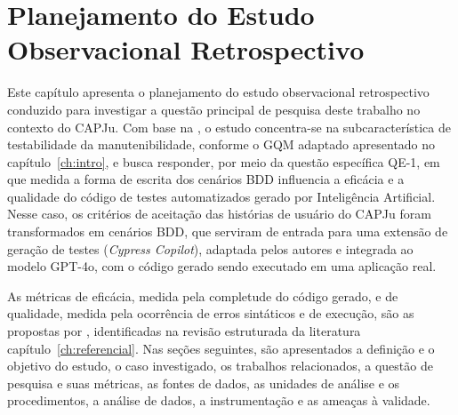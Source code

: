 \chapter{Planejamento do Estudo Observacional Retrospectivo}
\label{ch:proposta}

Este capítulo apresenta o planejamento do estudo observacional retrospectivo conduzido para investigar a questão principal de pesquisa deste trabalho no contexto do CAPJu. Com base na , o estudo concentra-se na subcaracterística de testabilidade da manutenibilidade, conforme o GQM adaptado apresentado no capítulo~\ref{ch:intro}, e busca responder, por meio da questão específica QE-1, em que medida a forma de escrita dos cenários BDD influencia a eficácia e a qualidade do código de testes automatizados gerado por Inteligência Artificial. Nesse caso, os critérios de aceitação das histórias de usuário do CAPJu foram transformados em cenários BDD, que serviram de entrada para uma extensão de geração de testes (\textit{Cypress Copilot}), adaptada pelos autores e integrada ao modelo GPT-4o, com o código gerado sendo executado em uma aplicação real.

As métricas de eficácia, medida pela completude do código gerado, e de qualidade, medida pela ocorrência de erros sintáticos e de execução, são as propostas por , identificadas na revisão estruturada da literatura capítulo~\ref{ch:referencial}. Nas seções seguintes, são apresentados a definição e o objetivo do estudo, o caso investigado, os trabalhos relacionados, a questão de pesquisa e suas métricas, as fontes de dados, as unidades de análise e os procedimentos, a análise de dados, a instrumentação e as ameaças à validade.

